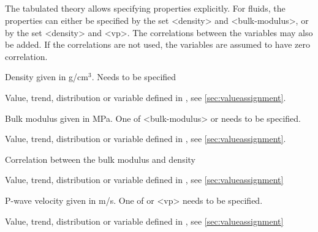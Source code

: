 {\subparagraph{}
 \slist
   \item \Description The tabulated theory allows specifying properties explicitly. For fluids, the properties can either be specified by the set <density> and <bulk-modulus>, or by the set <density> and <vp>. The correlations between the variables may also be added. If the correlations are not used, the variables are assumed to have zero correlation. 
   \item \Argument
   \item \Default 
 \elist

 \slist
   \item \Description Density given in g/cm$^3$. Needs to be specified
   \item \Argument Value, trend, distribution or variable defined in , see \autoref{sec:valueassignment}. 
   \item \Default 
 \elist

 \slist
   \item \Description Bulk modulus given in MPa. One of <bulk-modulus> or  needs to be specified.
   \item \Argument Value, trend, distribution or variable defined in , see \autoref{sec:valueassignment}. 
   \item \Default 
 \elist

 \slist
   \item \Description Correlation between the bulk modulus and density
   \item \Argument Value, trend, distribution or variable defined in , see \autoref{sec:valueassignment}
   \item {}
 \elist

 \slist
   \item \Description P-wave velocity given in m/s. One of  or <vp> needs to be specified.
   \item \Argument Value, trend, distribution or variable defined in , see \autoref{sec:valueassignment}
   \item \Default 
 \elist

}
